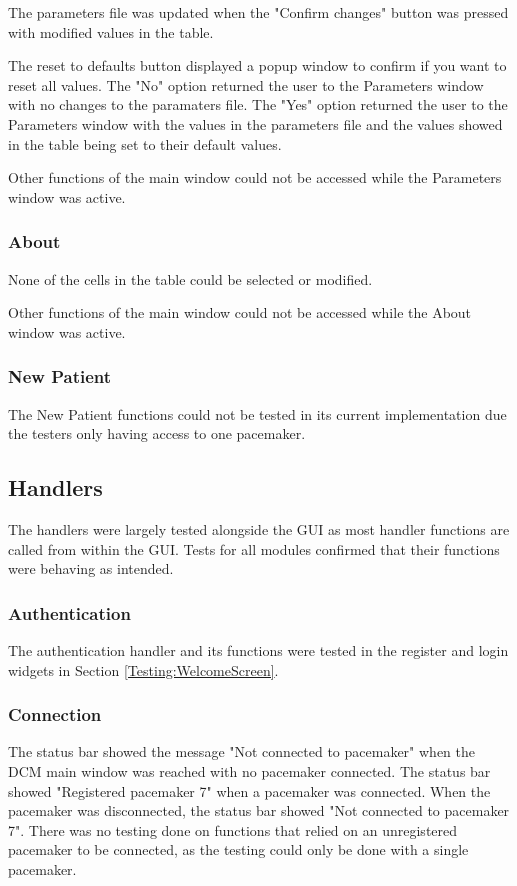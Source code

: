\documentclass[12pt]{article}
\begin{document}
The parameters file was updated when the "Confirm changes" button was pressed with modified values in the table. 

The reset to defaults button displayed a popup window to confirm if you want to reset all values. The "No" option returned the user to the Parameters window with no changes to the paramaters file. The "Yes" option returned the user to the Parameters window with the values in the parameters file and the values showed in the table being set to their default values. 

Other functions of the main window could not be accessed while the Parameters window was active.

\subsubsection{About}
None of the cells in the table could be selected or modified.

Other functions of the main window could not be accessed while the About window was active.

\subsubsection{New Patient}
The New Patient functions could not be tested in its current implementation due the testers only having access to one pacemaker.

\subsection{Handlers}
The handlers were largely tested alongside the GUI as most handler functions are called from within the GUI. Tests for all modules confirmed that their functions were behaving as intended. 

\subsubsection{Authentication}
The authentication handler and its functions were tested in the register and login widgets in Section \ref{Testing:WelcomeScreen}. 

\subsubsection{Connection}
The status bar showed the message "Not connected to pacemaker" when the DCM main window was reached with no pacemaker connected. The status bar showed "Registered pacemaker 7" when a pacemaker was connected. When the pacemaker was disconnected, the status bar showed "Not connected to pacemaker 7". There was no testing done on functions that relied on an unregistered pacemaker to be connected, as the testing could only be done with a single pacemaker.
\end{document}
